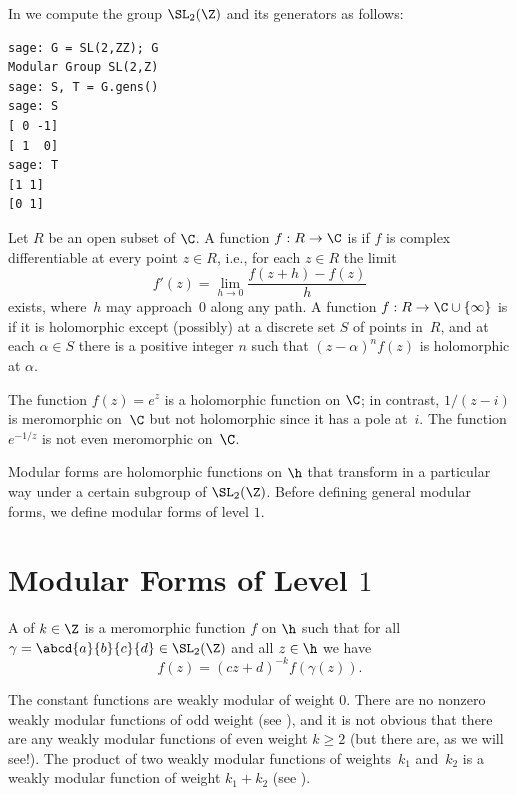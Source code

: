 In \sage{} we compute the group $\SL_2(\Z)$ and its generators as follows:
\begin{verbatim}
sage: G = SL(2,ZZ); G
Modular Group SL(2,Z)
sage: S, T = G.gens()
sage: S
[ 0 -1]
[ 1  0]
sage: T
[1 1]
[0 1]
\end{verbatim}

\begin{definition}
  Let $R$ be an open subset of $\C$.  A function $f:R\to \C$ is
   if $f$ is complex differentiable at every point
  $z\in R$, i.e., for each $z\in R$ the limit 
$$
  f'(z) = \lim_{h\to 0}
  \frac{f(z+h)-f(z)}{h}
$$ 
  exists, where~$h$ may approach~$0$ along any path.
  A function $f: R\to\C\cup \{\infty\}$ is 
    if it is holomorphic except (possibly) at a discrete set $S$ of
    points in~$ R$, and at each $\alpha\in S$ there is a positive
    integer $n$ such that $(z-\alpha)^n f(z)$ is holomorphic at
    $\alpha$.
\end{definition}

The function $f(z) = e^z$ is a holomorphic function on $\C$; in
contrast, $1/(z-i)$ is meromorphic on~$\C$ but not holomorphic
since it has a pole at~$i$.  The function $e^{-1/z}$ is not
even meromorphic on~$\C$. 

Modular forms are holomorphic functions on $\h$ that transform in a
particular way under a certain subgroup of $\SL_2(\Z)$.  Before
defining general modular forms, we define modular forms of level $1$.

\section{Modular Forms of Level $1$}\label{sec:modform1}

\begin{definition}
  A  of  $k\in\Z$ is a
  meromorphic function $f$ on $\h$ such that for all
  $\gamma=\abcd{a}{b}{c}{d}\in\SL_2(\Z)$ and all $z\in\h$ we have
\begin{equation}\label{eqn:modfunc}
   f(z) = (cz+d)^{-k} f(\gamma(z)).
 \end{equation}
\end{definition}
The constant functions are weakly modular of weight $0$.
There are no nonzero weakly modular functions of odd weight
(see ), and it is 
not obvious that there are any weakly modular functions
of even weight $k\geq 2$ (but there are, as we will see!). 
The product of two weakly modular functions of weights~$k_1$
and~$k_2$ is a weakly modular function of weight $k_1+k_2$ 
(see ).

